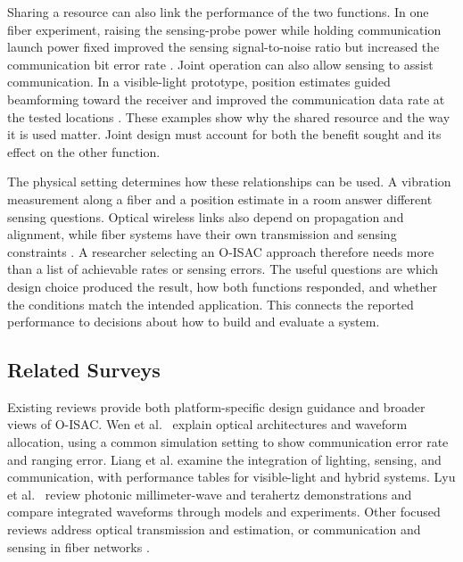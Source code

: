 Sharing a resource can also link the performance of the two functions.
In one fiber experiment, raising the sensing-probe power while holding
communication launch power fixed improved the sensing signal-to-noise ratio
but increased the communication bit error rate \cite{OISAC_SCR00057}.
Joint operation can also allow sensing to assist communication. In a
visible-light prototype, position estimates guided beamforming toward the
receiver and improved the communication data rate at the tested locations
\cite{OISAC_SCR00196}. These examples show why the shared resource and the way
it is used matter. Joint design must account for both the benefit sought and
its effect on the other function.

The physical setting determines how these relationships can be used.
A vibration measurement along a fiber and a position estimate in a room
answer different sensing questions. Optical wireless links also depend on
propagation and alignment, while fiber systems have their own transmission
and sensing constraints \cite{OISAC_SCR00916,OISAC_SCR01085,Mohsan2026OISACReview}.
A researcher selecting an O-ISAC approach therefore needs more than a list
of achievable rates or sensing errors. The useful questions are which design
choice produced the result, how both functions responded, and whether the
conditions match the intended application. This connects the reported
performance to decisions about how to build and evaluate a system.

\subsection{Related Surveys}
\label{sec:related_surveys}

Existing reviews provide both platform-specific design guidance and broader
views of O-ISAC. Wen et al.\ \cite{Wen2024OISACArchitectures} explain optical
architectures and waveform allocation, using a common simulation setting to
show communication error rate and ranging error. Liang et al.
\cite{Liang2024LiSACReview} examine the integration of lighting, sensing, and
communication, with performance tables for visible-light and hybrid systems.
Lyu et al.\ \cite{Lyu2026PhotonicTHzWaveforms} review photonic millimeter-wave
and terahertz demonstrations and compare integrated waveforms through models
and experiments. Other focused reviews address optical transmission and
estimation, or communication and sensing in fiber networks
\cite{Su2025OISACTheoryPractice,Khorasgani2026GeneralOpticalISACSurvey,
Liu2026OpticalFiberISACReview,Lu2026ConvergedFiberISACReview}.

